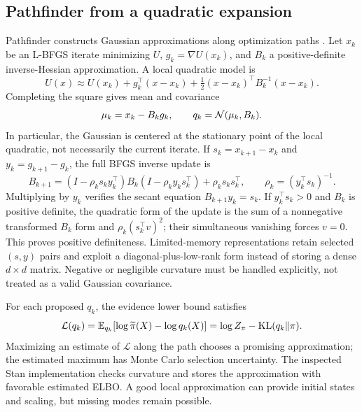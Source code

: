 \subsection{Pathfinder from a quadratic expansion}

Pathfinder constructs Gaussian approximations along optimization paths
\citep{zhang2022pathfinder}. Let
$x_k$ be an L-BFGS iterate minimizing $U$, $g_k=\nabla U(x_k)$, and $B_k$
a positive-definite inverse-Hessian approximation. A local quadratic model is
\begin{equation}
 U(x)\approx U(x_k)+g_k^\top(x-x_k)
               +\tfrac12(x-x_k)^\top B_k^{-1}(x-x_k).
 \label{eq:bf-modern-pathfinder-quadratic}
\end{equation}
Completing the square gives mean and covariance
\begin{equation}
 \mu_k=x_k-B_k g_k,\qquad q_k=\mathcal{N}(\mu_k,B_k).
 \label{eq:bf-modern-pathfinder-gaussian}
\end{equation}
In particular, the Gaussian is centered at the stationary point of the local
quadratic, not necessarily the current iterate. If $s_k=x_{k+1}-x_k$ and
$y_k=g_{k+1}-g_k$, the full BFGS inverse update is
\begin{equation}
 B_{k+1}=(I-\rho_k s_k y_k^\top)B_k(I-\rho_k y_k s_k^\top)
                  +\rho_k s_k s_k^\top,\qquad
 \rho_k=(y_k^\top s_k)^{-1}.
 \label{eq:bf-modern-bfgs}
\end{equation}
Multiplying by $y_k$ verifies the secant equation $B_{k+1}y_k=s_k$.
If $y_k^\top s_k>0$ and $B_k$ is positive definite, the quadratic form of
the update is the sum of a nonnegative transformed $B_k$ form and
$\rho_k(s_k^\top v)^2$; their simultaneous vanishing forces $v=0$.
This proves positive definiteness. Limited-memory representations retain
selected $(s,y)$ pairs and exploit a diagonal-plus-low-rank form instead of
storing a dense $d\times d$ matrix. Negative or negligible curvature must be
handled explicitly, not treated as a valid Gaussian covariance.

For each proposed $q_k$, the evidence lower bound satisfies
\begin{equation}
 \mathcal L(q_k)=\mathbb{E}_{q_k}[\log\widetilde\pi(X)-\log q_k(X)]
        =\log Z_\pi-\mathrm{KL}(q_k\|\pi).
 \label{eq:bf-modern-pathfinder-elbo}
\end{equation}
Maximizing an estimate of $\mathcal L$ along the path chooses a promising
approximation; the estimated maximum has Monte Carlo selection uncertainty.
The inspected Stan implementation checks curvature and stores the
approximation with favorable estimated ELBO. A good local approximation can
provide initial states and scaling, but missing modes remain possible.

